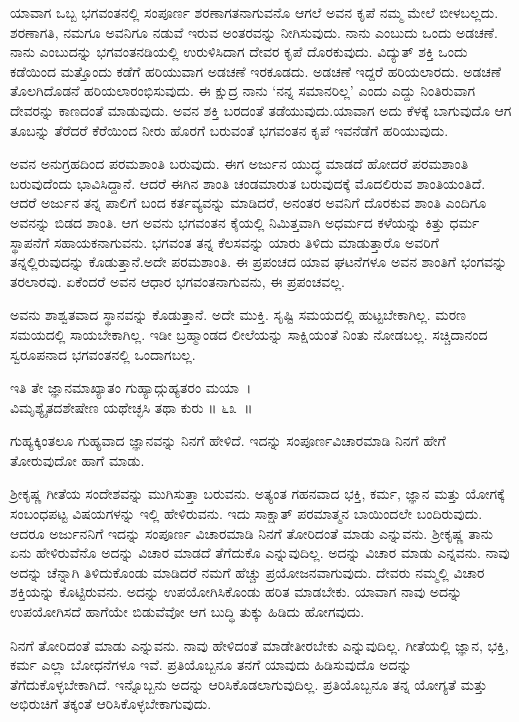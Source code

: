 ಯಾವಾಗ ಒಬ್ಬ ಭಗವಂತನಲ್ಲಿ ಸಂಪೂರ್ಣ ಶರಣಾಗತನಾಗುವನೊ ಆಗಲೆ ಅವನ ಕೃಪೆ ನಮ್ಮ ಮೇಲೆ ಬೀಳಬಲ್ಲದು. ಶರಣಾಗತಿ, ನಮಗೂ ಅವನಿಗೂ ನಡುವೆ ಇರುವ ಅಂತರವನ್ನು ನೀಗಿಸುವುದು. ನಾನು ಎಂಬುದು ಒಂದು ಅಡಚಣೆ. ನಾನು ಎಂಬುದನ್ನು ಭಗವಂತನಡಿಯಲ್ಲಿ ಉರುಳಿಸಿದಾಗ ದೇವರ ಕೃಪೆ ದೊರಕುವುದು. ವಿದ್ಯುತ್ ಶಕ್ತಿ ಒಂದು ಕಡೆಯಿಂದ ಮತ್ತೊಂದು ಕಡೆಗೆ ಹರಿಯುವಾಗ ಅಡಚಣೆ ಇರಕೂಡದು. ಅಡಚಣೆ ಇದ್ದರೆ ಹರಿಯಲಾರದು. ಅಡಚಣೆ ತೊಲಗಿದೊಡನೆ ಹರಿಯಲಾರಂಭಿಸುವುದು. ಈ ಕ್ಷುದ್ರ ನಾನು ‘ನನ್ನ ಸಮಾನರಿಲ್ಲ’ ಎಂದು ಎದ್ದು ನಿಂತಿರುವಾಗ ದೇವರನ್ನು ಕಾಣದಂತೆ ಮಾಡುವುದು. ಅವನ ಶಕ್ತಿ ಬರದಂತೆ ತಡೆಯುವುದು.\break ಯಾವಾಗ ಅದು ಕೆಳಕ್ಕೆ ಬಾಗುವುದೊ ಆಗ ತೂಬನ್ನು ತೆರೆದರೆ ಕೆರೆಯಿಂದ ನೀರು ಹೊರಗೆ ಬರುವಂತೆ ಭಗವಂತನ ಕೃಪೆ ಇವನೆಡೆಗೆ ಹರಿಯುವುದು.

ಅವನ ಅನುಗ್ರಹದಿಂದ ಪರಮಶಾಂತಿ ಬರುವುದು. ಈಗ ಅರ್ಜುನ ಯುದ್ಧ ಮಾಡದೆ ಹೋದರೆ ಪರಮಶಾಂತಿ ಬರುವುದೆಂದು ಭಾವಿಸಿದ್ದಾನೆ. ಆದರೆ ಈಗಿನ ಶಾಂತಿ ಚಂಡಮಾರುತ ಬರುವುದಕ್ಕೆ ಮೊದಲಿರುವ ಶಾಂತಿಯಂತಿದೆ. ಆದರೆ ಅರ್ಜುನ ತನ್ನ ಪಾಲಿಗೆ ಬಂದ ಕರ್ತವ್ಯವನ್ನು ಮಾಡಿದರೆ, ಅನಂತರ ಅವನಿಗೆ ದೊರಕುವ ಶಾಂತಿ ಎಂದಿಗೂ ಅವನನ್ನು ಬಿಡದ ಶಾಂತಿ. ಆಗ ಅವನು ಭಗವಂತನ ಕೈಯಲ್ಲಿ ನಿಮಿತ್ತವಾಗಿ ಅಧರ್ಮದ ಕಳೆಯನ್ನು ಕಿತ್ತು ಧರ್ಮ ಸ್ಥಾಪನೆಗೆ ಸಹಾಯಕನಾಗುವನು. ಭಗವಂತ ತನ್ನ ಕೆಲಸವನ್ನು ಯಾರು ತಿಳಿದು ಮಾಡುತ್ತಾರೊ ಅವರಿಗೆ ತನ್ನಲ್ಲಿರುವುದನ್ನು ಕೊಡುತ್ತಾನೆ.ಅದೇ ಪರಮಶಾಂತಿ. ಈ ಪ್ರಪಂಚದ ಯಾವ ಘಟನೆಗಳೂ ಅವನ ಶಾಂತಿಗೆ ಭಂಗವನ್ನು ತರಲಾರವು. ಏಕೆಂದರೆ ಅವನ ಆಧಾರ ಭಗವಂತನಾಗುವನು, ಈ ಪ್ರಪಂಚವಲ್ಲ.

ಅವನು ಶಾಶ್ವತವಾದ ಸ್ಥಾನವನ್ನು ಕೊಡುತ್ತಾನೆ. ಅದೇ ಮುಕ್ತಿ. ಸೃಷ್ಟಿ ಸಮಯದಲ್ಲಿ ಹುಟ್ಟಬೇಕಾಗಿಲ್ಲ. ಮರಣ ಸಮಯದಲ್ಲಿ ಸಾಯಬೇಕಾಗಿಲ್ಲ. ಇಡೀ ಬ್ರಹ್ಮಾಂಡದ ಲೀಲೆಯನ್ನು ಸಾಕ್ಷಿಯಂತೆ ನಿಂತು ನೋಡಬಲ್ಲ. ಸಚ್ಚಿದಾನಂದ ಸ್ವರೂಪನಾದ ಭಗವಂತನಲ್ಲಿ ಒಂದಾಗಬಲ್ಲ.

\begin{shloka}
ಇತಿ ತೇ ಜ್ಞಾನಮಾಖ್ಯಾತಂ ಗುಹ್ಯಾದ್ಗುಹ್ಯತರಂ ಮಯಾ~।\\ವಿಮೃಶ್ಯೈತದಶೇಷೇಣ ಯಥೇಚ್ಛಸಿ ತಥಾ ಕುರು \hfill॥ ೬೩~॥
\end{shloka}

\begin{artha}
ಗುಹ್ಯಕ್ಕಿಂತಲೂ ಗುಹ್ಯವಾದ ಜ್ಞಾನವನ್ನು ನಿನಗೆ ಹೇಳಿದೆ. ಇದನ್ನು ಸಂಪೂರ್ಣವಿಚಾರಮಾಡಿ ನಿನಗೆ ಹೇಗೆ ತೋರುವುದೋ ಹಾಗೆ ಮಾಡು.
\end{artha}

ಶ‍್ರೀಕೃಷ್ಣ ಗೀತೆಯ ಸಂದೇಶವನ್ನು ಮುಗಿಸುತ್ತಾ ಬರುವನು. ಅತ್ಯಂತ ಗಹನವಾದ ಭಕ್ತಿ, ಕರ್ಮ, ಜ್ಞಾನ ಮತ್ತು ಯೋಗಕ್ಕೆ ಸಂಬಂಧಪಟ್ಟ ವಿಷಯಗಳನ್ನು ಇಲ್ಲಿ ಹೇಳಿರುವನು. ಇದು ಸಾಕ್ಷಾತ್ ಪರಮಾತ್ಮನ ಬಾಯಿಂದಲೇ ಬಂದಿರುವುದು. ಆದರೂ ಅರ್ಜುನನಿಗೆ ಇದನ್ನು ಸಂಪೂರ್ಣ ವಿಚಾರಮಾಡಿ ನಿನಗೆ ತೋರಿದಂತೆ ಮಾಡು ಎನ್ನುವನು. ಶ‍್ರೀಕೃಷ್ಣ ತಾನು ಏನು ಹೇಳಿರುವೆನೊ ಅದನ್ನು ವಿಚಾರ ಮಾಡದೆ ತೆಗೆದುಕೊ ಎನ್ನುವುದಿಲ್ಲ. ಅದನ್ನು ವಿಚಾರ ಮಾಡು ಎನ್ನವನು. ನಾವು ಅದನ್ನು ಚೆನ್ನಾಗಿ ತಿಳಿದುಕೊಂಡು ಮಾಡಿದರೆ ನಮಗೆ ಹೆಚ್ಚು ಪ್ರಯೋಜನವಾಗುವುದು. ದೇವರು ನಮ್ಮಲ್ಲಿ ವಿಚಾರ ಶಕ್ತಿಯನ್ನು ಕೊಟ್ಟಿರುವನು. ಅದನ್ನು ಉಪಯೋಗಿಸಿಕೊಂಡು ಹರಿತ ಮಾಡಬೇಕು. ಯಾವಾಗ ನಾವು ಅದನ್ನು ಉಪಯೋಗಿಸದೆ ಹಾಗೆಯೇ ಬಿಡುವೆವೋ ಆಗ ಬುದ್ಧಿ ತುಕ್ಕು ಹಿಡಿದು ಹೋಗವುದು.

ನಿನಗೆ ತೋರಿದಂತೆ ಮಾಡು ಎನ್ನುವನು. ನಾವು ಹೇಳಿದಂತೆ ಮಾಡೇತೀರಬೇಕು ಎನ್ನುವುದಿಲ್ಲ. ಗೀತೆಯಲ್ಲಿ ಜ್ಞಾನ, ಭಕ್ತಿ, ಕರ್ಮ ಎಲ್ಲಾ ಬೋಧನೆಗಳೂ ಇವೆ. ಪ್ರತಿಯೊಬ್ಬನೂ ತನಗೆ ಯಾವುದು ಹಿಡಿಸುವುದೊ ಅದನ್ನು ತೆಗೆದುಕೊಳ್ಳಬೇಕಾಗಿದೆ. ಇನ್ನೊಬ್ಬನು ಅದನ್ನು ಆರಿಸಿಕೊಡಲಾಗುವುದಿಲ್ಲ. ಪ್ರತಿಯೊಬ್ಬನೂ ತನ್ನ ಯೋಗ್ಯತೆ ಮತ್ತು ಅಭಿರುಚಿಗೆ ತಕ್ಕಂತೆ ಆರಿಸಿ\-ಕೊಳ್ಳಬೇಕಾಗುವುದು.


